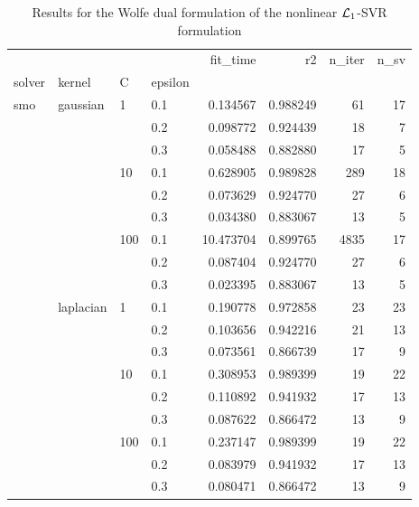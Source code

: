 \begin{table}[H]
\centering
\caption{Results for the Wolfe dual formulation of the nonlinear $\protect \mathcal{L}_1$-SVR formulation}
\label{nonlinear_dual_l1_svr_cv_results}
\begin{tabular}{llllrrrr}
\toprule
       &           &     &     &   fit\_time &        r2 &  n\_iter &  n\_sv \\
solver & kernel & C & epsilon &            &           &         &       \\
\midrule
smo & gaussian & 1   & 0.1 &   0.134567 &  0.988249 &      61 &    17 \\
       &           &     & 0.2 &   0.098772 &  0.924439 &      18 &     7 \\
       &           &     & 0.3 &   0.058488 &  0.882880 &      17 &     5 \\
       &           & 10  & 0.1 &   0.628905 &  0.989828 &     289 &    18 \\
       &           &     & 0.2 &   0.073629 &  0.924770 &      27 &     6 \\
       &           &     & 0.3 &   0.034380 &  0.883067 &      13 &     5 \\
       &           & 100 & 0.1 &  10.473704 &  0.899765 &    4835 &    17 \\
       &           &     & 0.2 &   0.087404 &  0.924770 &      27 &     6 \\
       &           &     & 0.3 &   0.023395 &  0.883067 &      13 &     5 \\
       & laplacian & 1   & 0.1 &   0.190778 &  0.972858 &      23 &    23 \\
       &           &     & 0.2 &   0.103656 &  0.942216 &      21 &    13 \\
       &           &     & 0.3 &   0.073561 &  0.866739 &      17 &     9 \\
       &           & 10  & 0.1 &   0.308953 &  0.989399 &      19 &    22 \\
       &           &     & 0.2 &   0.110892 &  0.941932 &      17 &    13 \\
       &           &     & 0.3 &   0.087622 &  0.866472 &      13 &     9 \\
       &           & 100 & 0.1 &   0.237147 &  0.989399 &      19 &    22 \\
       &           &     & 0.2 &   0.083979 &  0.941932 &      17 &    13 \\
       &           &     & 0.3 &   0.080471 &  0.866472 &      13 &     9 \\

\end{tabular}
\end{table}
